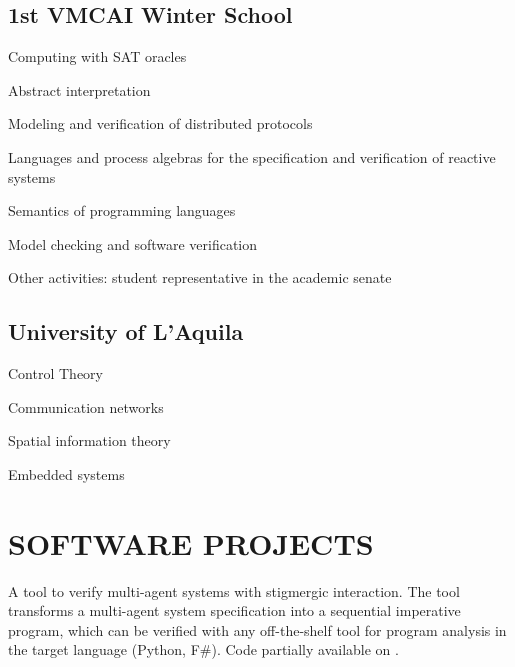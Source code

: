 \documentclass[a4paper]{deedy-resume-openfont}
\begin{document}
\begin{minipage}[t]{0.67\textwidth}
\subsection{1st VMCAI Winter School}
\begin{tightemize}
    \item Computing with SAT oracles
    \item Abstract interpretation
    \item Modeling and verification of distributed protocols
\end{tightemize}
\sectionsep

\begin{tightemize}
\item Languages and process algebras for the specification and verification of reactive systems
\item Semantics of programming languages
\item Model checking and software verification
\end{tightemize}
Other activities: student representative in the academic senate
\sectionsep

\subsection{University of L'Aquila}
\begin{tightemize}
\item Control Theory
\item Communication networks
\item Spatial information theory
\item Embedded systems
\end{tightemize}
\sectionsep

\section{SOFTWARE PROJECTS}
\location{\hspace{1em}}

\begin{tightemize}
\item
A tool to verify multi-agent systems with stigmergic interaction.
The tool transforms a multi-agent system specification into a sequential
imperative program, which can be verified with any off-the-shelf tool for
program analysis in the target language (Python, F\#).
Code partially available on \href{https://github.com/labs-lang/sliver}{}.


\end{tightemize}
\end{minipage}
\end{document}
